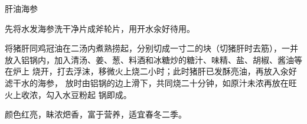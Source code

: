 \begin{recipe}{肝油海参}

\ingredients


\preparation

\step 先将水发海参洗干净片成斧轮片，用开水汆好待用。

\step 将猪肝同鸡冠油在二汤内煮熟捞起，分别切成一寸二的块（切猪肝时去筋），一并
放入铝锅内，加入清汤、姜、葱、料酒和冰糖炒的糖汁、味精、盐、胡椒、酱油等在炉上
烧开，打去浮沫，移微火上烧二小时；此时猪肝已发酥亮油，再放入汆好滤干水的海参，
放时由铝锅的边上滑下，共同烧二十分钟，如原汁未浓再放在旺火上收浓，勾入水豆粉起
锅即成。

\features

颜色红亮，眛浓𤆵香，富于营养，适宜春冬二季。

\end{recipe}

